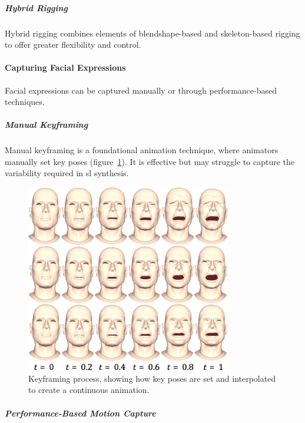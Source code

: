 \documentclass[../../main.tex]{subfiles}
\begin{document}
\subparagraph{Hybrid Rigging}
\label{ch:facial_expressions:related_work:face_rigging:hybrid_rigging}

Hybrid rigging combines elements of blendshape-based and skeleton-based rigging to offer greater flexibility and control.

\paragraph{Capturing Facial Expressions}
\label{ch:facial_expressions:related_work:face_rigging:capture}

Facial expressions can be captured manually or through performance-based techniques.

\subparagraph{Manual Keyframing}
\label{ch:facial_expressions:related_work:face_rigging:capture:manual_keyframing}

Manual keyframing is a foundational animation technique, where animators manually set key poses (figure~\ref{ch:facial_expressions:fig:keyframing}). It is effective but may struggle to capture the variability required in \gls{sl} synthesis.

\begin{figure}
    \centering
    \includegraphics[width=0.8\textwidth]{chapters/facial_expressions/images/keyframing.png}
    \caption{Keyframing process, showing how key poses are set and interpolated to create a continuous animation.}
    \label{ch:facial_expressions:fig:keyframing}
\end{figure}

\subparagraph{Performance-Based Motion Capture}
\label{ch:facial_expressions:related_work:face_rigging:capture:performance_based_motion_capture}
\end{document}
